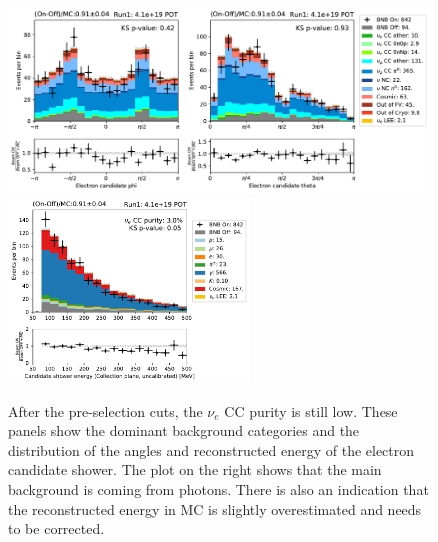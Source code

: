 \begin{figure}[h]
    \centering
    \includegraphics[height=4.9cm]{NueCCsel/Images/run1/pre_angles.pdf}
    \includegraphics[height=4.9cm]{NueCCsel/Images/run1/pre_shower_E_pdg.pdf}
    \caption{After the pre-selection cuts, the $\nu_e$ CC purity is still low. These panels show the dominant background categories and the distribution of the angles and reconstructed energy of the electron candidate shower. The plot on the right shows that the main background is coming from photons. There is also an indication that the reconstructed energy in MC is slightly overestimated and needs to be corrected.}
    \label{fig:pre_shower_E_pdg}
\end{figure}

\clearpage
